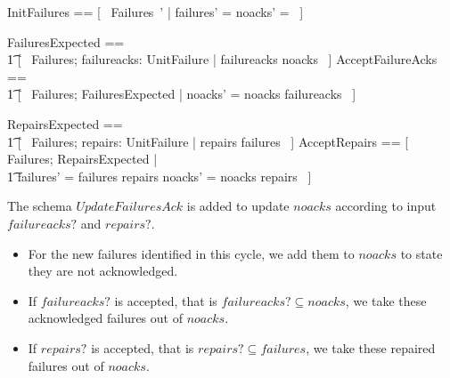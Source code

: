 \documentclass{report} %
\begin{document}
\begin{zed}
  InitFailures == [~ Failures~' | failures' = \emptyset \land noacks' = \emptyset ~]
\end{zed}

\begin{zed}
  FailuresExpected ==
  \\ %
  \t1 [~ Failures; failureacks: \power UnitFailure | failureacks \subseteq noacks ~]
  \also %
  AcceptFailureAcks ==
  \\ %
  \t1 [~ \Delta Failures; FailuresExpected | noacks' = noacks \setminus failureacks ~]
\end{zed}

\begin{zed}
  RepairsExpected ==
  \\ %
  \t1 [~ Failures; repairs: \power UnitFailure | repairs \subseteq failures ~]
  \also %
  AcceptRepairs == [~ \Delta Failures; RepairsExpected | \\ %
    \t1 failures' = failures \setminus repairs \land noacks' = noacks \setminus repairs ~]
\end{zed}

The schema $UpdateFailuresAck$ is added to update $noacks$ according to input $failureacks?$ and $repairs?$. 
\begin{itemize}
    \item For the new failures identified in this cycle, we add them to $noacks$ to state they are not acknowledged.
    \item If $failureacks?$ is accepted, that is $failureacks? \subseteq noacks$, we take these acknowledged failures  out of $noacks$.
    \item If $repairs?$ is accepted, that is $repairs? \subseteq failures$, we take these repaired failures  out of $noacks$.
\end{itemize}
\end{document}
